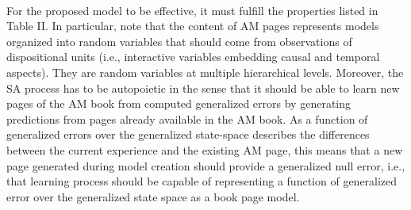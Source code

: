 \documentclass{article}
\begin{document}
		\paragraph{}For the proposed model to be effective, it must fulfill the
		properties listed in Table II. In particular, \citet{regazzoni-2020-multi-sensorial-generative-and-descriptive-self-awareness-models-for-autonomous-systems} note that the
		content of AM pages represents models organized into random
		variables that should come from observations of dispositional
		units (i.e., interactive variables embedding causal and temporal
		aspects). They are random variables at multiple hierarchical
		levels. Moreover, the SA process has to be autopoietic in
		the sense that it should be able to learn new pages of the
		AM book from computed generalized errors by generating
		predictions from pages already available in the AM book. As a
		function of generalized errors over the generalized state-space
		describes the differences between the current experience and
		the existing AM page, this means that a new page generated
		during model creation should provide a generalized null error,
		i.e., that learning process should be capable of representing a
		function of generalized error over the generalized state space
		as a book page model.
		
		
	
	
	
	
	
	
\end{document}
